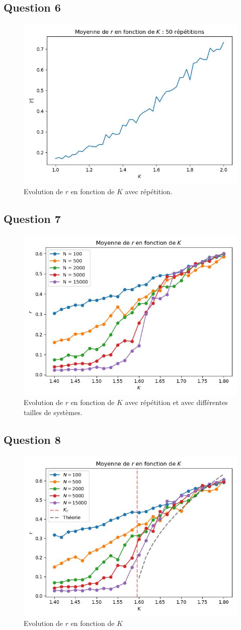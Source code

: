 \documentclass[a4paper, 11pt]{article}
\begin{document}
\subsection*{Question 6}
\begin{figure}[H]
    \centering
    \includegraphics[width=0.5\linewidth]{pics/kura6_50.jpg}
    \caption{Evolution de $r$ en fonction de $K$ avec répétition.}
\end{figure}

\subsection*{Question 7}
\begin{figure}[H]
    \centering
    \includegraphics[width=0.5\linewidth]{pics/kura7.jpg}
    \caption{Evolution de $r$ en fonction de $K$ avec répétition et avec différentes tailles de systèmes.}
\end{figure}

\subsection*{Question 8}
\begin{figure}[H]
    \centering
    \includegraphics[width=0.5\linewidth]{pics/kura8.jpg}
    \caption{Evolution de $r$ en fonction de $K$}
\end{figure}
\end{document}
